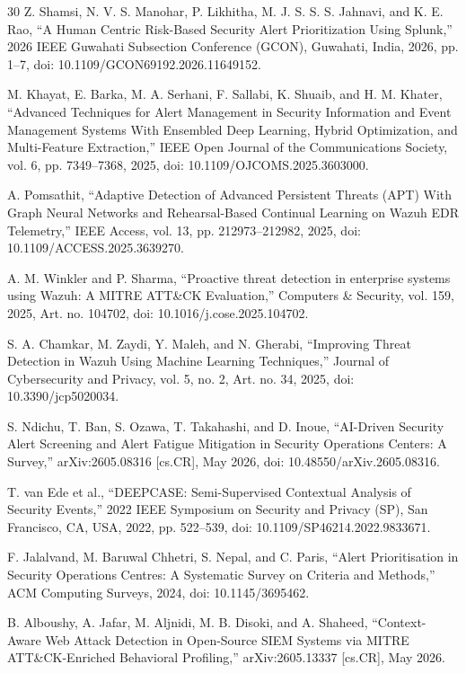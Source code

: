 \documentclass[conference]{IEEEtran}
\begin{document}
\begin{thebibliography}{30}
 Z. Shamsi, N. V. S. Manohar, P. Likhitha, M. J. S. S. S. Jahnavi, and K. E. Rao, ``A Human Centric Risk-Based Security Alert Prioritization Using Splunk,'' 2026 IEEE Guwahati Subsection Conference (GCON), Guwahati, India, 2026, pp. 1--7, doi: 10.1109/GCON69192.2026.11649152.

 M. Khayat, E. Barka, M. A. Serhani, F. Sallabi, K. Shuaib, and H. M. Khater, ``Advanced Techniques for Alert Management in Security Information and Event Management Systems With Ensembled Deep Learning, Hybrid Optimization, and Multi-Feature Extraction,'' IEEE Open Journal of the Communications Society, vol. 6, pp. 7349--7368, 2025, doi: 10.1109/OJCOMS.2025.3603000.

 A. Pomsathit, ``Adaptive Detection of Advanced Persistent Threats (APT) With Graph Neural Networks and Rehearsal-Based Continual Learning on Wazuh EDR Telemetry,'' IEEE Access, vol. 13, pp. 212973--212982, 2025, doi: 10.1109/ACCESS.2025.3639270.

 A. M. Winkler and P. Sharma, ``Proactive threat detection in enterprise systems using Wazuh: A MITRE ATT\&CK Evaluation,'' Computers \& Security, vol. 159, 2025, Art. no. 104702, doi: 10.1016/j.cose.2025.104702.

 S. A. Chamkar, M. Zaydi, Y. Maleh, and N. Gherabi, ``Improving Threat Detection in Wazuh Using Machine Learning Techniques,'' Journal of Cybersecurity and Privacy, vol. 5, no. 2, Art. no. 34, 2025, doi: 10.3390/jcp5020034.

 S. Ndichu, T. Ban, S. Ozawa, T. Takahashi, and D. Inoue, ``AI-Driven Security Alert Screening and Alert Fatigue Mitigation in Security Operations Centers: A Survey,'' arXiv:2605.08316 [cs.CR], May 2026, doi: 10.48550/arXiv.2605.08316.

 T. van Ede et al., ``DEEPCASE: Semi-Supervised Contextual Analysis of Security Events,'' 2022 IEEE Symposium on Security and Privacy (SP), San Francisco, CA, USA, 2022, pp. 522--539, doi: 10.1109/SP46214.2022.9833671.

 F. Jalalvand, M. Baruwal Chhetri, S. Nepal, and C. Paris, ``Alert Prioritisation in Security Operations Centres: A Systematic Survey on Criteria and Methods,'' ACM Computing Surveys, 2024, doi: 10.1145/3695462.

 B. Alboushy, A. Jafar, M. Aljnidi, M. B. Disoki, and A. Shaheed, ``Context-Aware Web Attack Detection in Open-Source SIEM Systems via MITRE ATT\&CK-Enriched Behavioral Profiling,'' arXiv:2605.13337 [cs.CR], May 2026.


\end{thebibliography}
\end{document}

